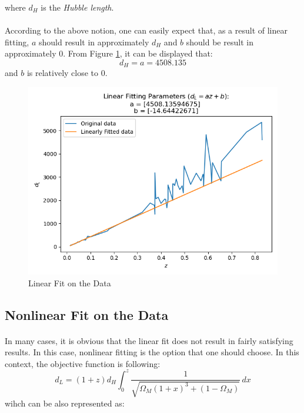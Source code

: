 \documentclass[letterpaper,12pt]{article}
\begin{document}

where $d_H$ is the \textit{Hubble length}.
\paragraph{} According to the above notion, one can easily expect that, as a result of linear fitting, $a$ should result in approximately $d_H$ and $b$ should be result in approximately $0$. From Figure \ref{fig:linfit}, it can be displayed that:
\begin{equation*}
    d_H = a = 4508.135
\end{equation*}
and $b$ is relatively close to $0$.

\begin{figure}[H]
    \centerline{\includegraphics[width=\linewidth]{figures/linfit.png}}
    \caption{Linear Fit on the Data}
    \label{fig:linfit}
    \end{figure}

\subsection{Nonlinear Fit on the Data}
\paragraph{} In many cases, it is obvious that the linear fit does not result in fairly satisfying results. In this case, nonlinear fitting is the option that one should choose. In this context, the objective function is following:
\begin{equation*}
    d_L = (1+z)d_H \int_{0}^{z} \frac{1}{\sqrt{\Omega_M(1+x)^3 + (1-\Omega_M)}} \,dx 
\end{equation*}
wihch can be also represented as:
\end{document}

